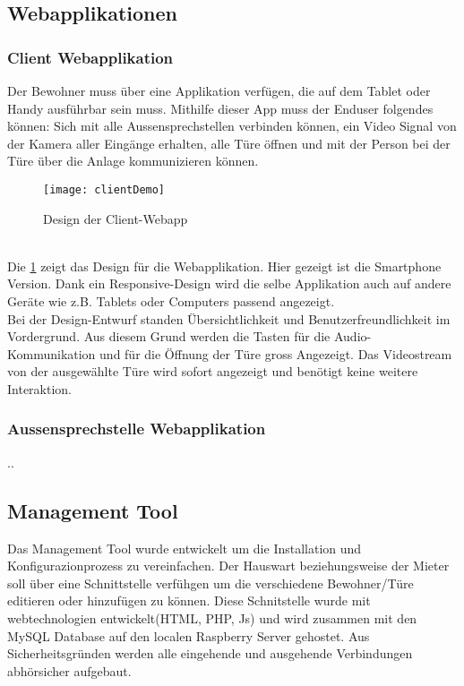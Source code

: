 \subsection{Webapplikationen}
\label{kap:webapp}


\subsubsection{Client Webapplikation}
Der Bewohner muss über eine Applikation verfügen, die auf dem Tablet oder Handy ausführbar sein muss. Mithilfe dieser App muss der Enduser folgendes können: Sich mit alle Aussensprechstellen verbinden können, ein Video Signal von der Kamera aller Eingänge erhalten, alle Türe öffnen und mit der Person bei der Türe über die Anlage kommunizieren können.
\\
\begin{figure}[htb!]
	\begin{center}
		\texttt{[image: clientDemo]}
		\caption[Design der Client-Webapp]{Design der Client-Webapp}
		\label{fig:clientDemo}
	\end{center}
\end{figure}
\\
Die \cref{fig:clientDemo} zeigt das Design für die Webapplikation. Hier gezeigt ist die Smartphone Version. Dank ein Responsive-Design wird die selbe Applikation auch auf andere Geräte wie z.B. Tablets oder Computers passend angezeigt.
\\ 
Bei der Design-Entwurf standen Übersichtlichkeit und Benutzerfreundlichkeit im Vordergrund. Aus diesem Grund werden die Tasten für die Audio-Kommunikation und für die Öffnung der Türe gross Angezeigt. Das Videostream von der ausgewählte Türe wird sofort angezeigt und benötigt keine weitere Interaktion. 

\subsubsection{Aussensprechstelle Webapplikation}
..

\subsection{Management Tool}
\label{kap:managementtool}
Das Management Tool wurde entwickelt um die Installation und Konfigurazionprozess zu vereinfachen. Der Hauswart beziehungsweise der Mieter soll über eine Schnittstelle verfühgen um die verschiedene Bewohner/Türe editieren oder hinzufügen zu können.
Diese Schnitstelle wurde mit webtechnologien entwickelt(HTML, PHP, Js) und wird zusammen mit den MySQL Database auf den localen Raspberry Server gehostet. Aus Sicherheitsgründen werden alle eingehende und ausgehende Verbindungen abhörsicher aufgebaut.


